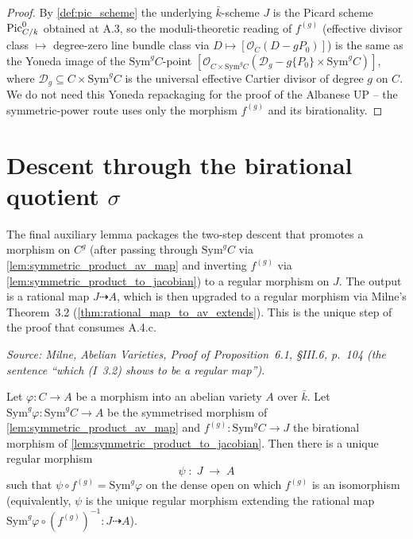 \begin{proof}
  By \cref{def:pic_scheme} the underlying \(\bar k\)-scheme \(J\) is the
  Picard scheme \(\operatorname{Pic}^0_{C/k}\) obtained at A.3, so the moduli-theoretic
  reading of \(f^{(g)}\) (effective divisor class \(\mapsto\) degree-zero
  line bundle class via \(D \mapsto [\mathcal O_C(D - g P_0)]\)) is the
  same as the Yoneda image of the \(\mathrm{Sym}^g C\)-point
  \([\mathcal O_{C \times \mathrm{Sym}^g C}(\mathcal D_g - g\{P_0\} \times
  \mathrm{Sym}^g C)]\), where \(\mathcal D_g \subseteq C \times \mathrm{Sym}^g
  C\) is the universal effective Cartier divisor of degree \(g\) on \(C\). We
  do not need this Yoneda repackaging for the proof of the Albanese UP --
  the symmetric-power route uses only the morphism \(f^{(g)}\) and its
  birationality.
\end{proof}

\section{Descent through the birational quotient \(\sigma\)}
\label{sec:albaneseup_descent}

The final auxiliary lemma packages the two-step descent that promotes a
morphism on \(C^g\) (after passing through \(\mathrm{Sym}^g C\) via
\cref{lem:symmetric_product_av_map} and inverting \(f^{(g)}\) via
\cref{lem:symmetric_product_to_jacobian}) to a regular morphism on
\(J\). The output is a rational map \(J \dashrightarrow A\), which is then
upgraded to a regular morphism via Milne's Theorem~3.2
(\cref{thm:rational_map_to_av_extends}). This is the unique step of the
proof that consumes A.4.c.

\begin{lemma}
  \label{lem:descent_through_birational_sigma}

  \textit{Source: Milne, \emph{Abelian Varieties}, Proof of Proposition~6.1,
  \S III.6, p.~104 (the sentence ``which (I~3.2) shows to be a regular
  map'').}

  Let \(\varphi \colon C \to A\) be a morphism into an abelian variety \(A\)
  over \(\bar k\). Let \(\mathrm{Sym}^g \varphi \colon \mathrm{Sym}^g C \to A\)
  be the symmetrised morphism of \cref{lem:symmetric_product_av_map} and
  \(f^{(g)} \colon \mathrm{Sym}^g C \to J\) the birational morphism of
  \cref{lem:symmetric_product_to_jacobian}. Then there is a unique
  regular morphism
  \[
    \psi \;\colon\; J \;\longrightarrow\; A
  \]
  such that \(\psi \circ f^{(g)} = \mathrm{Sym}^g \varphi\) on the dense open
  on which \(f^{(g)}\) is an isomorphism (equivalently, \(\psi\) is the unique
  regular morphism extending the rational map
  \(\mathrm{Sym}^g \varphi \circ (f^{(g)})^{-1} \colon J \dashrightarrow
  A\)).
\end{lemma}


